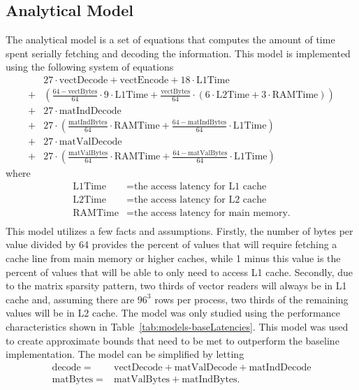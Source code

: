 \subsection{Analytical Model}

The analytical model is a set of equations that computes the amount of time spent serially fetching and decoding the information.
This model is implemented using the following system of equations
\begin{align*}
	& 27\cdot \mathrm{vectDecode}+\mathrm{vectEncode} + 18\cdot \mathrm{L1Time} \\
	+ & \left(\frac{64-\mathrm{vectBytes}}{64}\cdot 9\cdot \mathrm{L1Time}+\frac{\mathrm{vectBytes}}{64}\cdot \left(6\cdot \mathrm{L2Time}+3\cdot \mathrm{RAMTime}\right)\right) \\
	+ & 27\cdot\mathrm{matIndDecode} \\
	+ & 27\cdot\left(\frac{\mathrm{matIndBytes}}{64}\cdot\mathrm{RAMTime} + \frac{64-\mathrm{matIndBytes}}{64}\cdot\mathrm{L1Time}\right) \\
	+ & 27\cdot\mathrm{matValDecode} \\
	+ & 27\cdot\left(\frac{\mathrm{matValBytes}}{64}\cdot\mathrm{RAMTime}+\frac{64-\mathrm{matValBytes}}{64}\cdot\mathrm{L1Time}\right)
\end{align*}
where
\begin{align*}
	\mathrm{L1Time} &= \text{the access latency for L1 cache} \\
	\mathrm{L2Time} &= \text{the access latency for L2 cache} \\
	\mathrm{RAMTime} &= \text{the access latency for main memory.} \\
\end{align*}
This model utilizes a few facts and assumptions.
Firstly, the number of bytes per value divided by 64 provides the percent of values that will require fetching a cache line from main memory or higher caches, while 1 minus this value is the percent of values that will be able to only need to access L1 cache.
Secondly, due to the matrix sparsity pattern, two thirds of vector readers will always be in L1 cache and, assuming there are \(96^3\) rows per process, two thirds of the remaining values will be in L2 cache.
The model was only studied using the performance characteristics shown in Table~\ref{tab:models-baseLatencies}.
This model was used to create approximate bounds that need to be met to outperform the baseline implementation.
The model can be simplified by letting
\begin{align*}
\mathrm{decode} =& \mathrm{vectDecode} + \mathrm{matValDecode} + \mathrm{matIndDecode} \\
\mathrm{matBytes} =& \mathrm{matValBytes} + \mathrm{matIndBytes}.
\end{align*}
